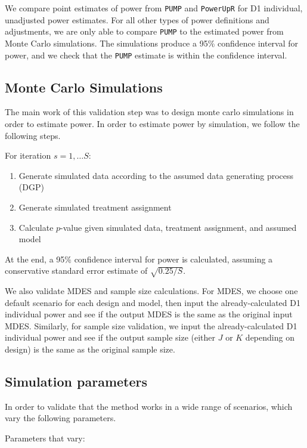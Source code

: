 \documentclass[
]{article}
\providecommand{\tightlist}{%
  \setlength{\itemsep}{0pt}\setlength{\parskip}{0pt}}
\begin{document}
We compare point estimates of power from \texttt{PUMP} and
\texttt{PowerUpR} for D1 individual, unadjusted power estimates. For all
other types of power definitions and adjustments, we are only able to
compare \texttt{PUMP} to the estimated power from Monte Carlo
simulations. The simulations produce a 95\% confidence interval for
power, and we check that the \texttt{PUMP} estimate is within the
confidence interval.

\subsection{Monte Carlo Simulations}

The main work of this validation step was to design monte carlo
simulations in order to estimate power. In order to estimate power by
simulation, we follow the following steps.

For iteration \(s = 1, \dots S\):

\begin{enumerate}
\def\labelenumi{\arabic{enumi}.}
\tightlist
\item
  Generate simulated data according to the assumed data generating
  process (DGP)
\item
  Generate simulated treatment assignment
\item
  Calculate \(p\)-value given simulated data, treatment assignment, and
  assumed model
\end{enumerate}

At the end, a 95\% confidence interval for power is calculated, assuming
a conservative standard error estimate of \(\sqrt{0.25/S}\).

We also validate MDES and sample size calculations. For MDES, we choose
one default scenario for each design and model, then input the
already-calculated D1 individual power and see if the output MDES is the
same as the original input MDES. Similarly, for sample size validation,
we input the already-calculated D1 individual power and see if the
output sample size (either \(J\) or \(K\) depending on design) is the
same as the original sample size.

\subsection{Simulation parameters}

In order to validate that the method works in a wide range of scenarios,
which vary the following parameters.

Parameters that vary:
\end{document}
